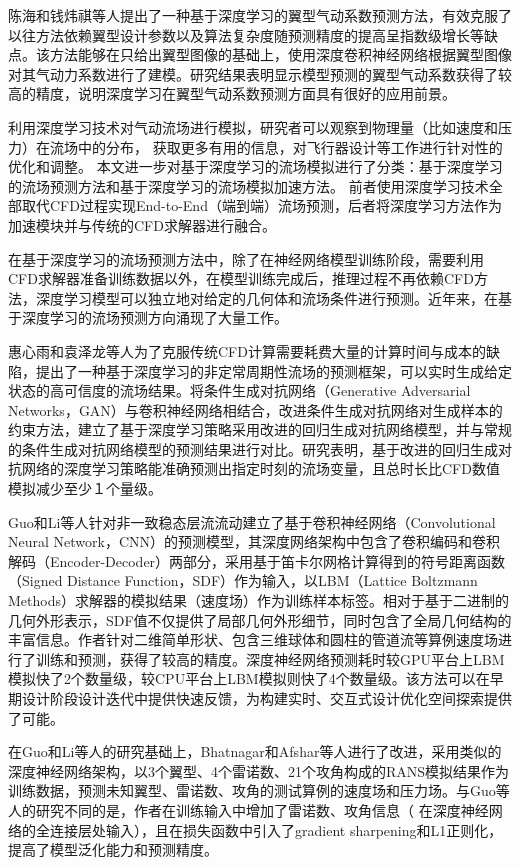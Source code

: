 陈海和钱炜祺等人\cite{陈海2018}提出了一种基于深度学习的翼型气动系数预测方法，有效克服了以往方法依赖翼型设计参数以及算法复杂度随预测精度的提高呈指数级增长等缺点。该方法能够在只给出翼型图像的基础上，使用深度卷积神经网络根据翼型图像对其气动力系数进行了建模。研究结果表明显示模型预测的翼型气动系数获得了较高的精度，说明深度学习在翼型气动系数预测方面具有很好的应用前景。

利用深度学习技术对气动流场进行模拟，研究者可以观察到物理量（比如速度和压力）在流场中的分布，
获取更多有用的信息，对飞行器设计等工作进行针对性的优化和调整。
本文进一步对基于深度学习的流场模拟进行了分类：基于深度学习的流场预测方法和基于深度学习的流场模拟加速方法。
前者使用深度学习技术全部取代CFD过程实现End-to-End（端到端）流场预测，后者将深度学习方法作为加速模块并与传统的CFD求解器进行融合。

在基于深度学习的流场预测方法中，除了在神经网络模型训练阶段，需要利用CFD求解器准备训练数据以外，在模型训练完成后，推理过程不再依赖CFD方法，深度学习模型可以独立地对给定的几何体和流场条件进行预测。近年来，在基于深度学习的流场预测方向涌现了大量工作。

惠心雨和袁泽龙等人\cite{惠心雨2019}为了克服传统CFD计算需要耗费大量的计算时间与成本的缺陷，提出了一种基于深度学习的非定常周期性流场的预测框架，可以实时生成给定状态的高可信度的流场结果。将条件生成对抗网络（Generative Adversarial Networks，GAN）与卷积神经网络相结合，改进条件生成对抗网络对生成样本的约束方法，建立了基于深度学习策略采用改进的回归生成对抗网络模型，并与常规的条件生成对抗网络模型的预测结果进行对比。研究表明，基于改进的回归生成对抗网络的深度学习策略能准确预测出指定时刻的流场变量，且总时长比CFD数值模拟减少至少１个量级。

Guo和Li等人\cite{DBLP:conf/kdd/GuoLI16}针对非一致稳态层流流动建立了基于卷积神经网络（Convolutional Neural Network，CNN）的预测模型，其深度网络架构中包含了卷积编码和卷积解码（Encoder-Decoder）两部分，采用基于笛卡尔网格计算得到的符号距离函数（Signed Distance Function，SDF）作为输入，以LBM（Lattice Boltzmann Methods）求解器的模拟结果（速度场）作为训练样本标签。相对于基于二进制的几何外形表示，SDF值不仅提供了局部几何外形细节，同时包含了全局几何结构的丰富信息。作者针对二维简单形状、包含三维球体和圆柱的管道流等算例速度场进行了训练和预测，获得了较高的精度。深度神经网络预测耗时较GPU平台上LBM模拟快了2个数量级，较CPU平台上LBM模拟则快了4个数量级。该方法可以在早期设计阶段设计迭代中提供快速反馈，为构建实时、交互式设计优化空间探索提供了可能。

在Guo和Li等人的研究基础上，Bhatnagar和Afshar等人\cite{bhatnagar2019prediction}进行了改进，采用类似的深度神经网络架构，以3个翼型、4个雷诺数、21个攻角构成的RANS模拟结果作为训练数据，预测未知翼型、雷诺数、攻角的测试算例的速度场和压力场。与Guo等人的研究不同的是，作者在训练输入中增加了雷诺数、攻角信息（ 在深度神经网络的全连接层处输入），且在损失函数中引入了gradient sharpening和L1正则化，提高了模型泛化能力和预测精度。


